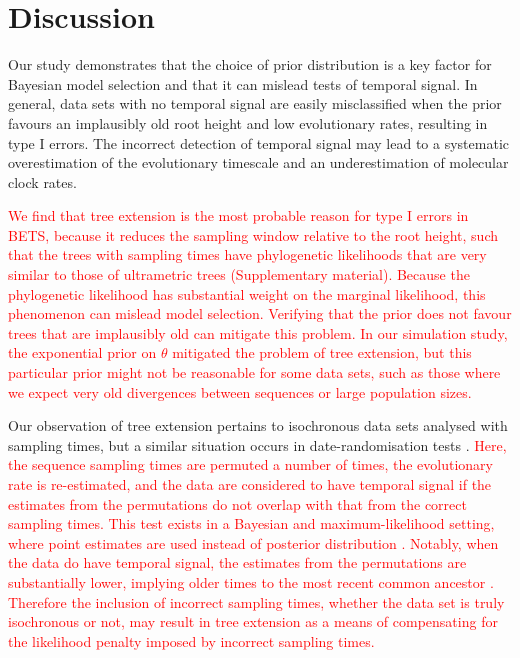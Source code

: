 \documentclass[10pt,letterpaper]{article}
\begin{document}
\section*{Discussion}
Our study demonstrates that the choice of prior distribution is a key factor for Bayesian model selection and that it can mislead tests of temporal signal. In general, data sets with no temporal signal are easily misclassified when the prior favours an implausibly old root height and low evolutionary rates, resulting in type I errors. The incorrect detection of temporal signal may lead to a systematic overestimation of the evolutionary timescale and an underestimation of molecular clock rates.

\textcolor{red}{We find that tree extension is the most probable reason for type I errors in BETS, because it reduces the sampling window relative to the root height, such that the trees with sampling times have phylogenetic likelihoods that are very similar to those of ultrametric trees (Supplementary material). Because the phylogenetic likelihood has substantial weight on the marginal likelihood, this phenomenon can mislead model selection. Verifying that the prior does not favour trees that are implausibly old can mitigate this problem. In our simulation study, the exponential prior on $\theta$ mitigated the problem of tree extension, but this particular prior might not be reasonable for some data sets, such as those where we expect very old divergences between sequences or large population sizes.}

Our observation of tree extension pertains to isochronous data sets analysed with sampling times, but a similar situation occurs in date-randomisation tests \cite{ramsden2009hantavirus}. \textcolor{red}{Here, the sequence sampling times are permuted a number of times, the evolutionary rate is re-estimated, and the data are considered to have temporal signal if the estimates from the permutations do not overlap with that from the correct sampling times. This test exists in a Bayesian and maximum-likelihood setting, where point estimates are used instead of posterior distribution \cite{duchene2018inferring}. Notably, when the data do have temporal signal, the estimates from the permutations are substantially lower, implying older times to the most recent common ancestor \cite{rieux2016inferences}. Therefore the inclusion of incorrect sampling times, whether the data set is truly isochronous or not, may result in tree extension as a means of compensating for the likelihood penalty imposed by incorrect sampling times.}
\end{document}

